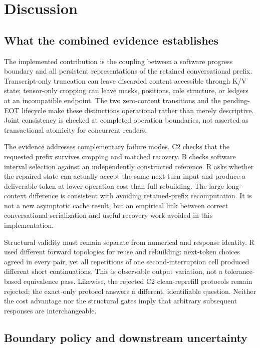 \section{Discussion}
\label{sec:discussion}

\subsection{What the combined evidence establishes}

The implemented contribution is the coupling between a software progress boundary and all persistent representations of the retained conversational prefix. Transcript-only truncation can leave discarded content accessible through K/V state; tensor-only cropping can leave masks, positions, role structure, or ledgers at an incompatible endpoint. The two zero-content transitions and the pending-EOT lifecycle make these distinctions operational rather than merely descriptive. Joint consistency is checked at completed operation boundaries, not asserted as transactional atomicity for concurrent readers.

The evidence addresses complementary failure modes. C2 checks that the requested prefix survives cropping and matched recovery. B checks software interval selection against an independently constructed reference. R asks whether the repaired state can actually accept the same next-turn input and produce a deliverable token at lower operation cost than full rebuilding. The large long-context difference is consistent with avoiding retained-prefix recomputation. It is not a new asymptotic cache result, but an empirical link between correct conversational serialization and useful recovery work avoided in this implementation.

Structural validity must remain separate from numerical and response identity. R used different forward topologies for reuse and rebuilding: next-token choices agreed in every pair, yet all repetitions of one second-interruption cell produced different short continuations. This is observable output variation, not a tolerance-based equivalence pass. Likewise, the rejected C2 clean-reprefill protocols remain rejected; the exact-only protocol answers a different, identifiable question. Neither the cost advantage nor the structural gates imply that arbitrary subsequent responses are interchangeable.

\subsection{Boundary policy and downstream uncertainty}

